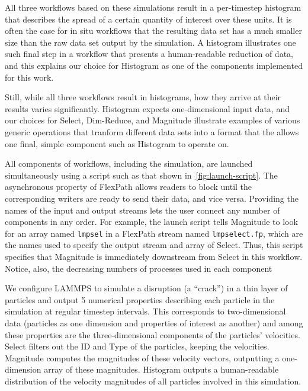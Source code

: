 
All three \sys workflows based on these simulations result in a
per-timestep histogram that describes
the spread of a certain quantity of interest over these
units.  It is often the case for in situ workflows
that the resulting data set has a much smaller size than
the raw data set output by the simulation. A histogram
illustrates one such final step in a workflow
that presents a human-readable
reduction of data, and this explains our choice for
Histogram as one of the \sys components implemented for this work.

Still, while all three workflows result in histograms,
how they arrive at their results varies significantly.
Histogram expects one-dimensional input data, and
our choices for Select, Dim-Reduce, and Magnitude
illustrate examples of various generic operations that tranform
different data sets into a format that the allows
one final, simple component such as Histogram to operate on.

All components of \sys workflows, including the simulation,
are launched simultaneously using a script such as
that shown in~\autoref{fig:launch-script}.
The asynchronous property of FlexPath
allows readers to block until the corresponding
writers are ready to send their data, and vice versa.
Providing the names of the input and output streams
lets the user connect any number of components
in any order.
For example, the launch script tells Magnitude
to look for an array named \texttt{lmpsel}
in a FlexPath stream named \texttt{lmpselect.fp},
which are the names used to specify the output
stream and array of Select.
Thus, this script specifies that Magnitude is
immediately downstream from Select in this workflow.
Notice, also, the decreasing numbers of processes
used in each component

We configure LAMMPS to simulate a disruption (a ``crack'') in a thin layer of
particles and output 5 numerical properties describing each particle in the
simulation at regular timestep intervals. This corresponds to two-dimensional
data (particles as one dimension and properties of interest as another) and
among these properties are the three-dimensional components of the particles'
velocities.
Select filters out the ID and Type of the particles, keeping
the velocities. Magnitude computes the magnitudes
of these velocity vectors, outputting a one-dimension array
of these magnitudes. Histogram outputs a human-readable distribution
of the velocity magnitudes of all particles involved in this simulation.

